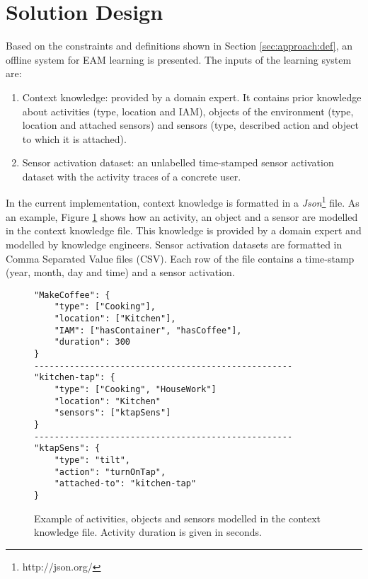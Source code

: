 \section{Solution Design}
\label{sec:approach:solution}

Based on the constraints and definitions shown in Section \ref{sec:approach:def}, an offline system for EAM learning is presented. The inputs of the learning system are:

\begin{enumerate}
 \item Context knowledge: provided by a domain expert. It contains prior knowledge about activities (type, location and IAM), objects of the environment (type, location and attached sensors) and sensors (type, described action and object to which it is attached).
 \item Sensor activation dataset: an unlabelled time-stamped sensor activation dataset with the activity traces of a concrete user.
\end{enumerate}

In the current implementation, context knowledge is formatted in a \textit{Json}\footnote{http://json.org/} file. As an example, Figure \ref{fig-context-json} shows how an activity, an object and a sensor are modelled in the context knowledge file. This knowledge is provided by a domain expert and modelled by knowledge engineers. Sensor activation datasets are formatted in Comma Separated Value files (CSV). Each row of the file contains a time-stamp (year, month, day and time) and a sensor activation. 

\begin{figure}[htbp]
\begin{small}
\begin{lstlisting}
"MakeCoffee": {
	"type": ["Cooking"],
	"location": ["Kitchen"],
	"IAM": ["hasContainer", "hasCoffee"],
	"duration": 300
}
---------------------------------------------------
"kitchen-tap": {
	"type": ["Cooking", "HouseWork"]
	"location": "Kitchen"
	"sensors": ["ktapSens"]
}
---------------------------------------------------
"ktapSens": {
	"type": "tilt",
	"action": "turnOnTap",
	"attached-to": "kitchen-tap"
}
\end{lstlisting}
\end{small}
\caption{Example of activities, objects and sensors modelled in the context knowledge file. Activity duration is given in seconds.}
\label{fig-context-json}
\end{figure}

